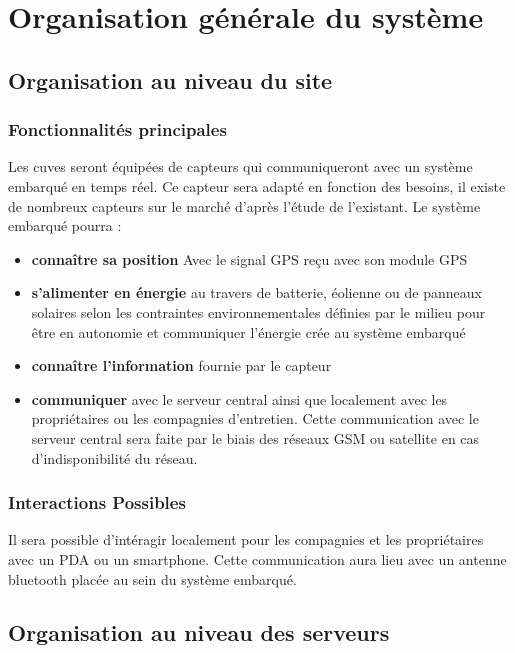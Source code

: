 
\section{Organisation générale du système}

\subsection{Organisation au niveau du site}

\subsubsection{Fonctionnalités principales}
Les cuves seront équipées de capteurs qui communiqueront avec un système
embarqué en temps réel. Ce capteur sera adapté en fonction des besoins, il
existe de nombreux capteurs sur le marché d'après l'étude de l'existant. Le
système embarqué pourra : 

\begin{itemize}
\item \textbf{connaître sa position} Avec le signal GPS reçu avec son module GPS
\item \textbf{s'alimenter en énergie} au travers de batterie, éolienne ou
de panneaux solaires selon les contraintes environnementales définies par
le milieu pour être en autonomie et communiquer l'énergie crée au système
embarqué
\item \textbf{connaître l'information} fournie par le capteur
\item \textbf{communiquer} avec le serveur central ainsi que localement
avec les propriétaires ou les compagnies d'entretien. Cette communication
avec le serveur central sera faite par le biais des réseaux GSM ou
satellite en cas d'indisponibilité du réseau.
\end{itemize}

\subsubsection{Interactions Possibles}

Il sera possible d'intéragir localement pour les compagnies et les
propriétaires avec un PDA ou un smartphone. Cette communication aura lieu
avec un antenne bluetooth placée au sein du système embarqué.


\subsection{Organisation au niveau des serveurs}

